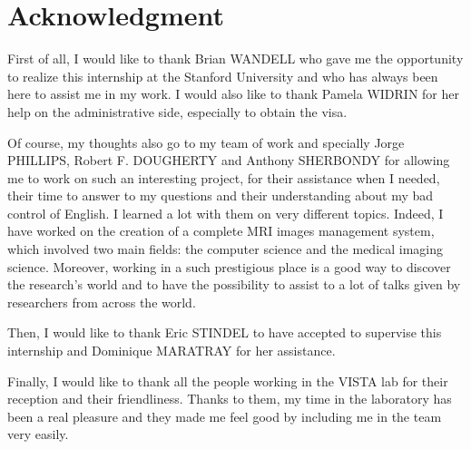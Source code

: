 \section*{Acknowledgment}
\vspace{0.2cm}
\par
First of all, I would like to thank Brian WANDELL who gave me the opportunity to realize this internship at the Stanford University and who has always been here to assist me in my work. I would also like to thank Pamela WIDRIN for her help on the administrative side, especially to obtain the visa.\\
\par
Of course, my thoughts also go to my team of work and specially Jorge PHILLIPS, Robert F. DOUGHERTY and Anthony SHERBONDY for allowing me to work on such an interesting project, for their assistance when I needed, their time to answer to my questions and their understanding about my bad control of English. I learned a lot with them on very different topics. Indeed, I have worked on the creation of a complete MRI images management system, which involved two main fields: the computer science and the medical imaging science. Moreover, working in a such prestigious place is a good way to discover the research's world and to have the possibility to assist to a lot of talks given by researchers from across the world.\\
\par
Then, I would like to thank Eric STINDEL to have accepted to supervise this internship and Dominique MARATRAY for her assistance.\\
\par 
Finally, I would like to thank all the people working in the VISTA lab for their reception and their friendliness. Thanks to them, my time in the laboratory has been a real pleasure and they made me feel good by including me in the team very easily.